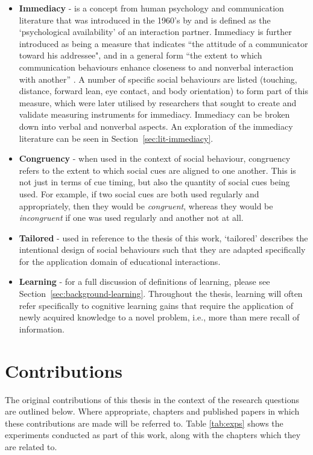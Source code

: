 \begin{itemize}
  \item \textbf{Immediacy} - is a concept from human psychology and communication literature that was introduced in the 1960's by \citet{mehrabian1968some} and is defined as the `psychological availability' of an interaction partner. Immediacy is further introduced as being a measure that indicates ``the attitude of a communicator toward his addressee", and in a general form ``the extent to which communication behaviours enhance closeness to and nonverbal interaction with another'' \citet{mehrabian1968some}. A number of specific social behaviours are listed (touching, distance, forward lean, eye contact, and body orientation) to form part of this measure, which were later utilised by researchers that sought to create and validate measuring instruments for immediacy. Immediacy can be broken down into verbal and nonverbal aspects. An exploration of the immediacy literature can be seen in Section~\ref{sec:lit-immediacy}.
  
  \item \textbf{Congruency} - when used in the context of social behaviour, congruency refers to the extent to which social cues are aligned to one another. This is not just in terms of cue timing, but also the quantity of social cues being used. For example, if two social cues are both used regularly and appropriately, then they would be \textit{congruent}, whereas they would be \textit{incongruent} if one was used regularly and another not at all.
  
  \item \textbf{Tailored} - used in reference to the thesis of this work, `tailored' describes the intentional design of social behaviours such that they are adapted specifically for the application domain of educational interactions.
  
  \item \textbf{Learning} - for a full discussion of definitions of learning, please see Section~\ref{sec:background-learning}. Throughout the thesis, learning will often refer specifically to cognitive learning gains that require the application of newly acquired knowledge to a novel problem, i.e., more than mere recall of information.
\end{itemize}

\section{Contributions}\label{sec:intro-contr}
The original contributions of this thesis in the context of the research questions are outlined below. Where appropriate, chapters and published papers in which these contributions are made will be referred to. Table \ref{tab:exps} shows the experiments conducted as part of this work, along with the chapters which they are related to.

